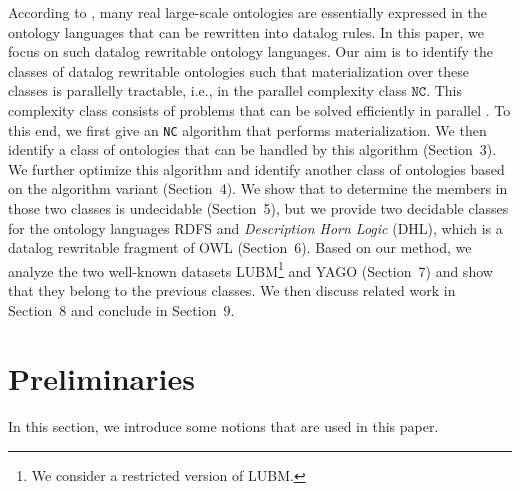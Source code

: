 \documentclass{article}
\begin{document}
According to \citeauthor{DBLP:conf/aaai/MotikNPHO14} , many real large-scale ontologies are essentially expressed in the ontology languages that can be rewritten into datalog rules. In this paper, we focus on such datalog rewritable ontology languages.
Our aim is to identify the classes of datalog rewritable ontologies such that materialization
over these classes is parallelly tractable, i.e., in the parallel complexity class $\texttt{NC}$. This complexity class consists of problems that can be solved  efficiently in parallel \cite{RAYMOND-GREENLAW}. To this end, we first
give an \texttt{NC} algorithm that performs materialization. We then identify a class of ontologies that can be handled
by this algorithm (Section~3). We further optimize this algorithm and identify another class of ontologies based on the algorithm variant (Section~4). We show that to determine the members in those two classes is undecidable (Section~5), but we provide
two decidable classes for the ontology languages RDFS and \emph{Description Horn Logic} (DHL), which is a datalog rewritable fragment of OWL \cite{DBLP:conf/www/GrosofHVD03} (Section~6).
Based on our method, we analyze the two well-known datasets LUBM\footnote{We consider a restricted version of LUBM.} and YAGO (Section~7) and show that they belong to the previous classes. We then discuss related work in Section~8 and conclude in Section~9.

\section{Preliminaries}

In this section, we introduce some notions that are used in this paper.
\end{document}
